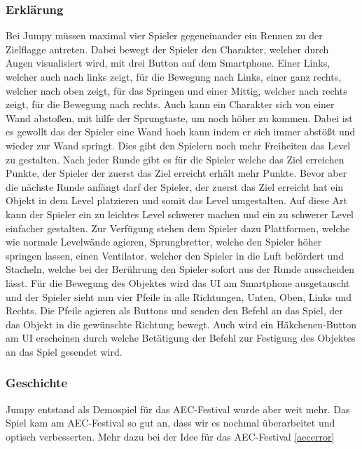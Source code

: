 \subsubsection{Erklärung}
Bei Jumpy müssen maximal vier Spieler gegeneinander ein Rennen zu der Zielflagge antreten. Dabei bewegt der Spieler den Charakter, welcher durch Augen visualisiert wird, mit drei Button auf dem Smartphone. Einer Links, welcher auch nach links zeigt, für die Bewegung nach Links, einer ganz rechts, welcher nach oben zeigt, für das Springen und einer Mittig, welcher nach rechts zeigt, für die Bewegung nach rechts. Auch kann ein Charakter sich von einer Wand abstoßen, mit hilfe der Sprungtaste, um noch höher zu kommen. Dabei ist es gewollt das der Spieler eine Wand hoch kann indem er sich immer abstößt und wieder zur Wand springt. Dies gibt den Spielern noch mehr Freiheiten das Level zu gestalten. Nach jeder Runde gibt es für die Spieler welche das Ziel erreichen Punkte, der Spieler der zuerst das Ziel erreicht erhält mehr Punkte. Bevor aber die nächste Runde anfängt darf der Spieler, der zuerst das Ziel erreicht hat ein Objekt in dem Level platzieren und somit das Level umgestalten. Auf diese Art kann der Spieler ein zu leichtes Level schwerer machen und ein zu schwerer Level einfacher gestalten.
Zur Verfügung stehen dem Spieler dazu Plattformen, welche wie normale Levelwände agieren, Sprungbretter, welche den Spieler höher springen lassen, einen Ventilator, welcher den Spieler in die Luft befördert und Stacheln, welche bei der Berührung den Spieler sofort aus der Runde ausscheiden lässt. Für die Bewegung des Objektes wird das UI am Smartphone ausgetauscht und der Spieler sieht nun vier Pfeile in alle Richtungen, Unten, Oben, Links und Rechts. Die Pfeile agieren als Buttons und senden den Befehl an das Spiel, der das Objekt in die gewünschte Richtung bewegt. Auch wird ein Häkchenen-Button am UI erscheinen durch welche Betätigung der Befehl zur Festigung des Objektes an das Spiel gesendet wird.
\subsubsection{Geschichte}
Jumpy entstand als Demospiel für das AEC-Festival wurde aber weit mehr. Das Spiel kam am AEC-Festival so gut an, dass wir es nochmal überarbeitet und optisch verbesserten. 
Mehr dazu bei der Idee für das AEC-Festival \ref{aecerror}
